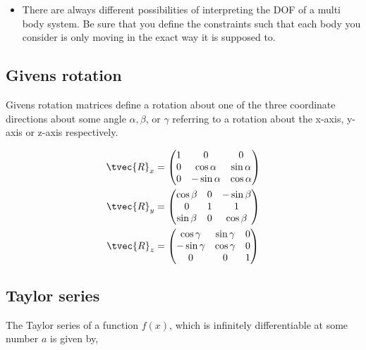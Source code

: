 \documentclass[10pt,a4paper]{scrartcl}
\begin{document}
\begin{multicols*}{2}

\begin{itemize}
\item There are always different possibilities of interpreting the DOF of a multi body system. Be sure that you define the constraints such that each body you consider is only moving in the exact way it is supposed to.
\end{itemize}

\subsection{Givens rotation}

Givens rotation matrices define a rotation about one of the three coordinate directions about some angle $\alpha,\beta$, or $\gamma$ referring to a rotation about the x-axis, y-axis or z-axis respectively. 

\begin{equation*}
\begin{aligned}
\tvec{R}_x&=\begin{pmatrix}1&0&0\\0&\cos\alpha&\sin\alpha\\0&-\sin\alpha&\cos\alpha\end{pmatrix}\\
\tvec{R}_y&=\begin{pmatrix}\cos\beta&0&-\sin\beta\\0&1&1\\\sin\beta&0&\cos\beta\end{pmatrix}\\
\tvec{R}_z&=\begin{pmatrix}\cos\gamma&\sin\gamma&0\\-\sin\gamma&\cos\gamma&0\\0&0&1\end{pmatrix}
\end{aligned}
\end{equation*}

\subsection{Taylor series}

The Taylor series of a function $f(x)$, which is infinitely differentiable at some number $a$ is given by,


\end{multicols*}
\end{document}
